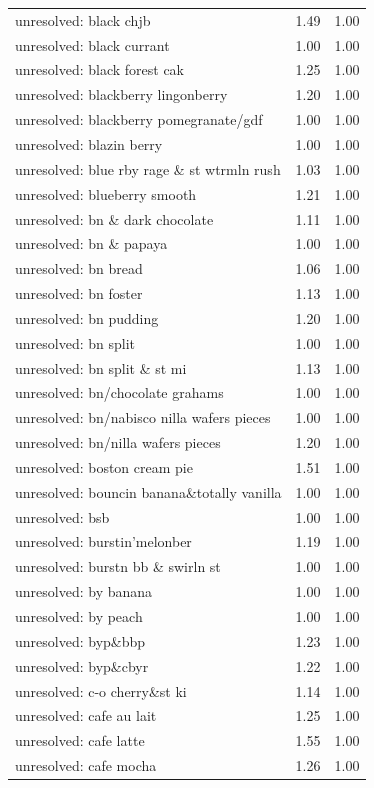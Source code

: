 \begin{table}
\begin{tabular}{lrr}
unresolved: black chjb & 1.49 & 1.00 \\
unresolved: black currant & 1.00 & 1.00 \\
unresolved: black forest cak & 1.25 & 1.00 \\
unresolved: blackberry lingonberry & 1.20 & 1.00 \\
unresolved: blackberry pomegranate/gdf & 1.00 & 1.00 \\
unresolved: blazin berry & 1.00 & 1.00 \\
unresolved: blue rby rage \& st wtrmln rush & 1.03 & 1.00 \\
unresolved: blueberry smooth & 1.21 & 1.00 \\
unresolved: bn \& dark chocolate & 1.11 & 1.00 \\
unresolved: bn \& papaya & 1.00 & 1.00 \\
unresolved: bn bread & 1.06 & 1.00 \\
unresolved: bn foster & 1.13 & 1.00 \\
unresolved: bn pudding & 1.20 & 1.00 \\
unresolved: bn split & 1.00 & 1.00 \\
unresolved: bn split \& st mi & 1.13 & 1.00 \\
unresolved: bn/chocolate grahams & 1.00 & 1.00 \\
unresolved: bn/nabisco nilla wafers pieces & 1.00 & 1.00 \\
unresolved: bn/nilla wafers pieces & 1.20 & 1.00 \\
unresolved: boston cream pie & 1.51 & 1.00 \\
unresolved: bouncin banana\&totally vanilla & 1.00 & 1.00 \\
unresolved: bsb & 1.00 & 1.00 \\
unresolved: burstin'melonber & 1.19 & 1.00 \\
unresolved: burstn bb \& swirln st & 1.00 & 1.00 \\
unresolved: by banana & 1.00 & 1.00 \\
unresolved: by peach & 1.00 & 1.00 \\
unresolved: byp\&bbp & 1.23 & 1.00 \\
unresolved: byp\&cbyr & 1.22 & 1.00 \\
unresolved: c-o cherry\&st ki & 1.14 & 1.00 \\
unresolved: cafe au lait & 1.25 & 1.00 \\
unresolved: cafe latte & 1.55 & 1.00 \\
unresolved: cafe mocha & 1.26 & 1.00 \\

\end{tabular}
\end{table}
